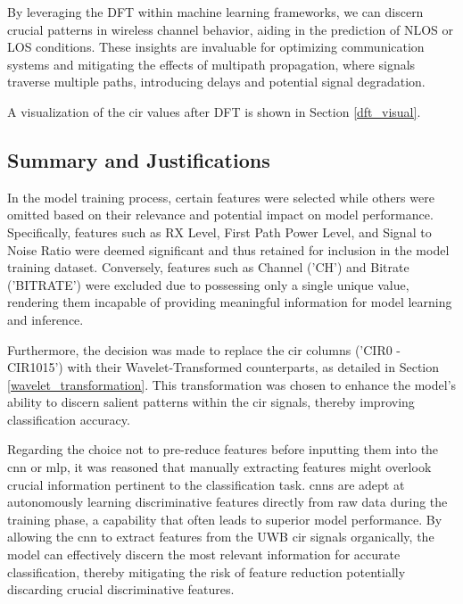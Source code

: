 By leveraging the DFT within machine learning frameworks, we can discern crucial patterns in wireless channel behavior, aiding in the prediction of NLOS or LOS conditions. These insights are invaluable for optimizing communication systems and mitigating the effects of multipath propagation, where signals traverse multiple paths, introducing delays and potential signal degradation.

A visualization of the \acrshort{cir} values after DFT is shown in Section \ref{dft_visual}.

\subsection{Summary and Justifications}

In the model training process, certain features were selected while others were omitted based on their relevance and potential impact on model performance. Specifically, features such as RX Level, First Path Power Level, and Signal to Noise Ratio were deemed significant and thus retained for inclusion in the model training dataset. Conversely, features such as Channel ('CH') and Bitrate ('BITRATE') were excluded due to possessing only a single unique value, rendering them incapable of providing meaningful information for model learning and inference.

Furthermore, the decision was made to replace the \acrshort{cir} columns ('CIR0 - CIR1015') with their Wavelet-Transformed counterparts, as detailed in Section \ref{wavelet_transformation}. This transformation was chosen to enhance the model's ability to discern salient patterns within the \acrshort{cir} signals, thereby improving classification accuracy.

Regarding the choice not to pre-reduce features before inputting them into the \gls{cnn} or \gls{mlp}, it was reasoned that manually extracting features might overlook crucial information pertinent to the classification task. \acrshort{cnn}s are adept at autonomously learning discriminative features directly from raw data during the training phase, a capability that often leads to superior model performance. By allowing the \acrshort{cnn} to extract features from the UWB \acrshort{cir} signals organically, the model can effectively discern the most relevant information for accurate classification, thereby mitigating the risk of feature reduction potentially discarding crucial discriminative features.


